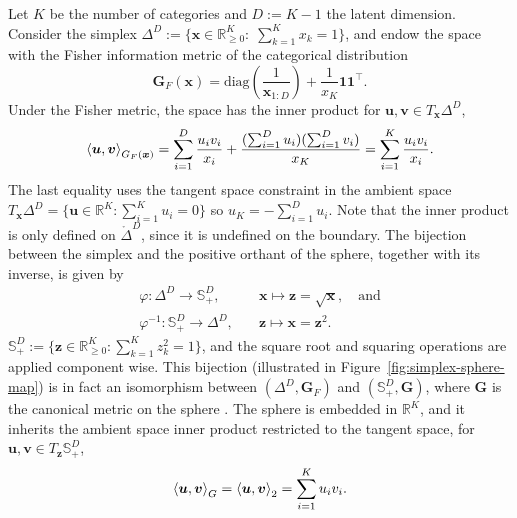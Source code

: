 Let $K$ be the number of categories and $D:=K-1$ the latent dimension. Consider the simplex $\Delta^{D}:=\{\boldsymbol{x}\in\mathbb{R}_{\ge 0}^{K}:\;\sum_{k=1}^{K}x_k=1\}$, and endow the space with the Fisher information metric of the categorical distribution \citep{Miyamoto2024}
\begin{equation*}
 \mathbf{G}_F(\boldsymbol{x}) = \mathrm{diag}\left(\frac{1}{\boldsymbol{x}_{1:D}}\right) + \frac{1}{x_K} \mathbf{1}\mathbf{1}^\top.
\end{equation*}
Under the Fisher metric, the space has the inner product for $\boldsymbol{u},\boldsymbol{v}\in T_{\boldsymbol{x}}\Delta^D$,
\begin{align*}
    \left\langle \boldsymbol{u}, \boldsymbol{v} \right\rangle_{G_F(\boldsymbol{x})} = \sum_{i=1}^D \frac{u_iv_i}{x_i} + \frac{( \sum_{i=1}^D u_i)( \sum_{i=1}^D v_i)}{x_K}  = \sum_{i=1}^K \frac{u_i v_i}{x_i}.
\end{align*}
The last equality uses the tangent space constraint in the ambient space $T_{\boldsymbol{x}}\Delta^D = \{\boldsymbol{u}\in\mathbb{R}^K: \sum_{i=1}^K u_i = 0\}$ so $u_K = -\sum_{i=1}^D u_i $.
Note that the inner product is only defined on $\mathring{\Delta}^D$, since it is undefined on the boundary. The bijection between the simplex and the positive orthant of the sphere, together with its inverse, is given by
\begin{equation}
\begin{aligned}
\varphi: \Delta^{D} \to \mathbb{S}_+^{D}, \quad
&\boldsymbol{x}\mapsto \boldsymbol{z} = \sqrt{\boldsymbol{x}},\quad \text{and}\\
\varphi^{-1}: \mathbb{S}_+^{D} \to \Delta^{D}, \quad
&\boldsymbol{z} \mapsto \boldsymbol{x} = \boldsymbol{z}^2.
\end{aligned}
\label{eq:bij_sfm}
\end{equation}
$\mathbb{S}_{+}^{D} := \{ \boldsymbol{z} \in \mathbb{R}_{\ge 0}^{K} : \sum_{k=1}^{K} z_k^2 = 1 \}$, and the square root and squaring operations are applied component wise. 
This bijection (illustrated in Figure~\ref{fig:simplex-sphere-map}) is in fact an isomorphism between $(\Delta^D  , \mathbf{G}_F)$ and $(\mathbb{S}_{+}^{D}, \mathbf{G})$, where $\mathbf{G}$ is the canonical metric on the sphere \citep{Miyamoto2024}. The sphere is embedded in $\mathbb{R}^K$, and it inherits the ambient space inner product restricted to the tangent space, for $\boldsymbol{u},\boldsymbol{v}\in T_{\boldsymbol{z}} \mathbb{S}_{+}^{D}$,
\begin{equation*}
    \left\langle \boldsymbol{u}, \boldsymbol{v} \right\rangle_G = \left\langle \boldsymbol{u}, \boldsymbol{v} \right\rangle_2 = \sum_{i=1}^K u_i v_i.
\end{equation*} 
